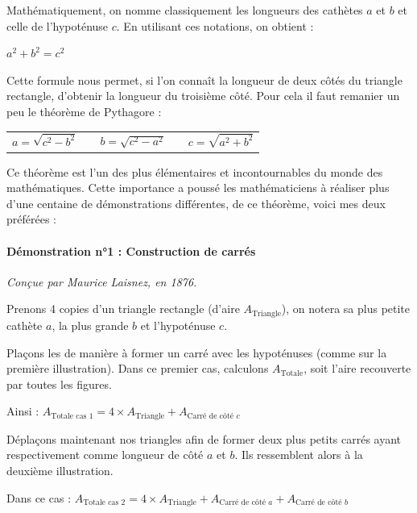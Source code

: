 \documentclass[a4paper, twoside]{article}
\begin{document}
Mathématiquement, on nomme classiquement les longueurs des cathètes $a$ et $b$ et celle
de l'hypoténuse $c$. En utilisant ces notations, on obtient :

\begin{center}
	$a^2 + b^2 = c^2$
\end{center}

Cette formule nous permet, si l'on connaît la longueur de deux côtés du triangle rectangle,
d'obtenir la longueur du troisième côté. Pour cela il faut remanier un peu le théorème de Pythagore :

\begin{center}
	\begin{tabular}{ccccc}
		$a = \sqrt{c^2 - b^2}$ &
		\phantom{text}         &
		$b = \sqrt{c^2 - a^2}$ &
		\phantom{text}         &
		$c = \sqrt{a^2 + b^2}$ \\
	\end{tabular}
\end{center}

\smallbreak

Ce théorème est l'un des plus élémentaires et incontournables du monde des mathématiques. 
Cette importance a poussé les mathématiciens à réaliser plus d'une centaine de démonstrations différentes, 
de ce théorème, voici mes deux préférées :

\paragraph*{Démonstration n°1 : Construction de carrés}

\textit{Conçue par Maurice Laisnez, en 1876.}

Prenons 4 copies d'un triangle rectangle (d'aire $A_{\text{Triangle}}$), 
on notera sa plus petite cathète $a$, la plus grande $b$ et l'hypoténuse $c$.

Plaçons les de manière à former un carré avec les hypoténuses (comme sur la première illustration).
Dans ce premier cas, calculons $A_{\text{Totale}}$, soit l'aire recouverte par toutes les figures.

Ainsi : $A_{\text{Totale cas 1}} = 4 \times A_{\text{Triangle}} + A_{\text{Carré de côté }c}$

\medbreak

Déplaçons maintenant nos triangles afin de former deux plus petits carrés ayant respectivement 
comme longueur de côté $a$ et $b$. Ils ressemblent alors à la deuxième illustration. 

Dans ce cas : $A_{\text{Totale cas 2}} = 4 \times A_{\text{Triangle}} + A_{\text{Carré de côté }a} + A_{\text{Carré de côté }b}$
\end{document}
